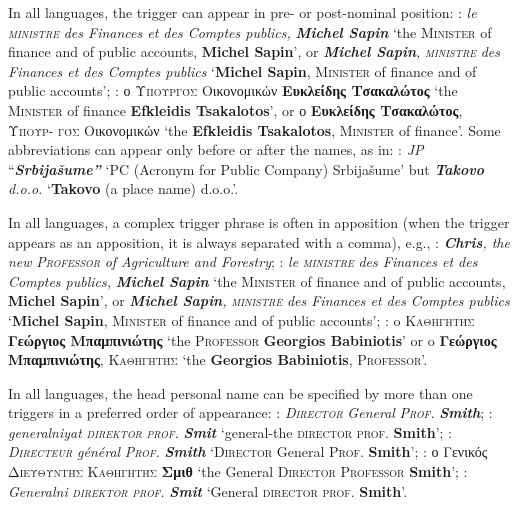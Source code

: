 \documentclass[output=paper]{langsci/langscibook}
\newcommand{\trigger}[1]{\textsc{#1}}
\begin{document}
In all languages, the trigger can appear in pre- or post-nominal
position: : \textit{le }\textit{\trigger{ministre}} \textit{des
Finances et des Comptes publics, }\textbf{\textit{Michel Sapin }}‘the
\trigger{Minister} of finance and of public accounts, \textbf{Michel
Sapin}’,\textbf{ }or \textbf{\textit{Michel Sapin}}\textit{,
}\textit{\trigger{ministre}} \textit{des Finances et des Comptes publics
}‘\textbf{Michel Sapin}, \trigger{Minister} of finance and of public
accounts’; : ο \trigger{Υπουργός} Οικονομικών
\textbf{Ευκλείδης Τσακαλώτος} ‘the \trigger{Minister}
of finance \textbf{Efkleidis Tsakalotos}’, or ο
\textbf{Ευκλείδης Τσακαλώτος},
\trigger{Υπουρ-} \trigger{γός} Οικονομικών ‘the \textbf{Efkleidis
Tsakalotos}, \trigger{Minister} of finance’. Some abbreviations can
appear only before or after the names, as in: : \textit{\trigger{JP}}
“\textbf{\textit{Srbijašume”}} ‘PC (Acronym for Public Company)
Srbijašume’ but \textbf{\textit{Takovo}} \textit{d.o.o.}
‘\textbf{Takovo} (a place name) d.o.o.’.



In all languages, a complex trigger phrase is often in apposition (when
the trigger appears as an apposition, it is always separated with a
comma), e.g., : \textbf{\textit{Chris}}\textit{, the new
}\textit{\trigger{Professor}} \textit{of Agriculture and Forestry}; :
\textit{le }\textit{\trigger{ministre}} \textit{des Finances et des
Comptes publics, }\textbf{\textit{Michel Sapin }}‘the \trigger{Minister}
of finance and of public accounts, \textbf{Michel Sapin}’,\textbf{ }or
\textbf{\textit{Michel Sapin}}\textit{, }\textit{\trigger{ministre}}
\textit{des Finances et des Comptes publics }‘\textbf{Michel
Sapin},\textbf{ }\trigger{Minister} of finance and of public accounts’;
: o \trigger{Καθηγητής} \textbf{Γεώργιος
Μπαμπινιώτης} ‘the \trigger{Professor} \textbf{Georgios Babiniotis}’ or
o \textbf{Γεώργιος Μπαμπινιώτης},
\trigger{Καθηγητής} ‘the \textbf{Georgios Babiniotis},
\trigger{Professor}’.



In all languages, the head personal name can be specified by more than
one triggers in a preferred order of appearance: :
\textit{\trigger{Director}} \textit{General }\textit{\trigger{Prof.}}
\textbf{\textit{Smith}}; : \textit{generalniyat
}\textit{\trigger{direktor}} \textit{\trigger{prof.}} \textbf{\textit{Smit
}} `general-the \trigger{director} \trigger{prof.} \textbf{Smith}';\textit{
}: \textit{\trigger{Directeur}} \textit{général }\textit{\trigger{Prof.}}
\textbf{\textit{Smith }}`\trigger{Director} General \trigger{Prof.}
\textbf{Smith}'; : ο Γενικός \trigger{Διευθυντής Καθηγητής} \textbf{Σμιθ} `the General
\trigger{Director} \trigger{Professor} \textbf{Smith}'; :
\textit{Generalni }\textit{\trigger{direktor}} \textit{\trigger{prof.}}
\textbf{\textit{Smit }}`General \trigger{director} \trigger{prof.}
\textbf{Smith}'.
\end{document}

